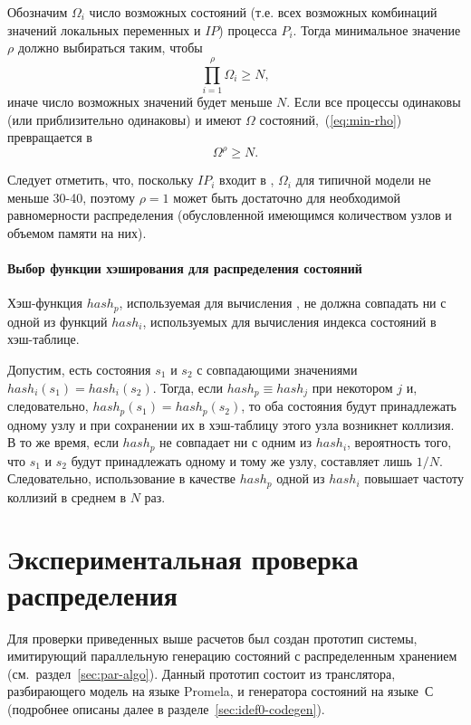 Обозначим $\Omega_i$ число возможных состояний (т.е. всех возможных комбинаций значений
локальных переменных и $IP$) процесса $P_i$. Тогда минимальное значение $\rho$ должно
выбираться таким, чтобы
\begin{equation}
  \label{eq:min-rho}
  \prod_{i = 1}^\rho{\Omega_i} \geq N,
\end{equation}
иначе число возможных значений  будет меньше $N$. Если все процессы
одинаковы (или приблизительно одинаковы) и имеют $\Omega$ состояний,~(\ref{eq:min-rho})
превращается в 
\begin{equation}
  \label{eq:min-rho-homo}
  \Omega^\rho \geq N.
\end{equation}

Следует отметить, что, поскольку $IP_i$ входит в , $\Omega_i$ для типичной
модели не меньше 30-40, поэтому $\rho = 1$ может быть достаточно для необходимой
равномерности распределения (обусловленной имеющимся количеством узлов и объемом памяти на
них).

\paragraph{Выбор функции хэширования для распределения состояний}
\label{sec:partition-hash-function}

Хэш-функция $hash_p$, используемая для вычисления , не должна совпадать ни
с одной из функций $hash_i$, используемых для вычисления индекса состояний в
хэш-таблице. 

Допустим, есть состояния $s_1$ и $s_2$ с совпадающими значениями $hash_i(s_1) =
hash_i(s_2)$. Тогда, если $hash_p \equiv hash_j$ при некотором $j$ и, следовательно,
$hash_p(s_1) = hash_p(s_2)$, то оба состояния будут принадлежать одному узлу и при
сохранении их в хэш-таблицу этого узла возникнет коллизия. В то же время, если $hash_p$ не
совпадает ни с одним из $hash_i$, вероятность того, что $s_1$ и $s_2$ будут принадлежать
одному и тому же узлу, составляет лишь $1/N$. Следовательно, использование в качестве
$hash_p$ одной из $hash_i$ повышает частоту коллизий в среднем в $N$ раз.

\section{Экспериментальная проверка распределения}
\label{sec:paremu-test}

Для проверки приведенных выше расчетов был создан прототип системы, имитирующий
параллельную генерацию состояний с распределенным хранением
(см.~раздел~\ref{sec:par-algo}). Данный прототип состоит из транслятора, разбирающего
модель на языке Promela, и генератора состояний на языке~С (подробнее описаны далее в
разделе~\ref{sec:idef0-codegen}).

